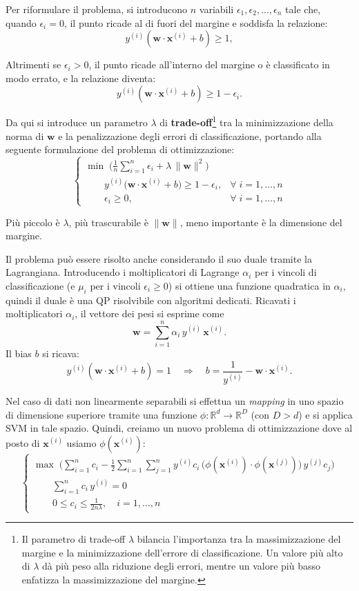 Per riformulare il problema, si introducono $n$ variabili $\epsilon_1, \epsilon_2, ..., \epsilon_n$ tale che, quando $\epsilon_i = 0$, il punto ricade al di fuori del margine e soddisfa la relazione:
\[
y^{(i)}(\mathbf{w}\cdot\mathbf{x}^{(i)}+b)\ge 1,
\]

\noindent
Altrimenti se $\epsilon_i > 0$, il punto ricade all'interno del margine o è classificato in modo errato, e la relazione diventa:
\[
y^{(i)}(\mathbf{w}\cdot\mathbf{x}^{(i)}+b)\ge 1 - \epsilon_i.
\]

Da qui si introduce un parametro $\lambda$ di \textbf{trade-off}\footnote{Il parametro di trade-off $\lambda$ bilancia l'importanza tra la massimizzazione del margine e la minimizzazione dell'errore di classificazione. Un valore più alto di $\lambda$ dà più peso alla riduzione degli errori, mentre un valore più basso enfatizza la massimizzazione del margine.} tra la minimizzazione della norma di $\mathbf{w}$ e la penalizzazione degli errori di classificazione, portando alla seguente formulazione del problema di ottimizzazione:
\[
\begin{cases}
\displaystyle\min\;\biggl(\frac{1}{n}\sum_{i=1}^n\epsilon_i + \lambda\,\|\mathbf{w}\|^2\biggr)\\[6pt]
\qquad y^{(i)}\bigl(\mathbf{w}\cdot\mathbf{x}^{(i)}+b\bigr)\ge 1-\epsilon_i, & \forall\; i=1,\dots,n\\[4pt]
\qquad \epsilon_i\ge 0, & \forall\; i=1,\dots,n
\end{cases}
\]

\noindent
Più piccolo è $\lambda$, più trascurabile è $\|\mathbf{w}\|$, meno importante è la dimensione del margine.

Il problema può essere risolto anche considerando il suo duale tramite la Lagrangiana. Introducendo i moltiplicatori di Lagrange $\alpha_i$ per i vincoli di classificazione (e $\mu_i$ per i vincoli $\epsilon_i\ge0$) si ottiene una funzione quadratica in $\alpha_i$, quindi il duale è una QP risolvibile con algoritmi dedicati. Ricavati i moltiplicatori $\alpha_i$, il vettore dei pesi si esprime come
\[
\mathbf{w}=\sum_{i=1}^n \alpha_i\,y^{(i)}\,\mathbf{x}^{(i)}.
\]
Il bias $b$ si ricava:
\[
y^{(i)}(\mathbf{w}\cdot\mathbf{x}^{(i)}+b)=1 \quad\Longrightarrow\quad b=\frac{1}{y^{(i)}} - \mathbf{w}\cdot\mathbf{x}^{(i)}.
\]

Nel caso di dati non linearmente separabili si effettua un \emph{mapping} in uno spazio di dimensione superiore tramite una funzione $\phi:\mathbb{R}^d\to\mathbb{R}^D$ (con $D>d$) e si applica SVM in tale spazio. Quindi, creiamo un nuovo problema di ottimizzazione dove al posto di $\mathbf{x}^{(i)}$ usiamo $\phi(\mathbf{x}^{(i)})$:
\[
\begin{cases}
\displaystyle\max\;\Biggl(\sum_{i=1}^n c_i - \tfrac{1}{2}\sum_{i=1}^n\sum_{j=1}^n y^{(i)} c_i\,\bigl(\phi(\mathbf{x}^{(i)})\!\cdot\!\phi(\mathbf{x}^{(j)})\bigr)\,y^{(j)} c_j\Biggr)\\[6pt]
\qquad \displaystyle\sum_{i=1}^n c_i\,y^{(i)} = 0\\[6pt]
\qquad 0 \le c_i \le \frac{1}{2n\lambda},\quad i=1,\dots,n
\end{cases}
\]

